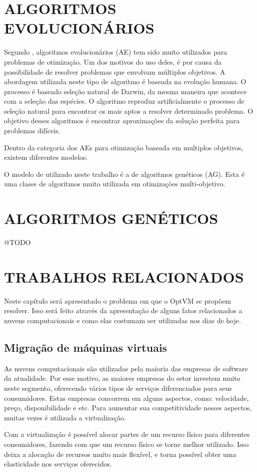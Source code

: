 \section{ALGORITMOS EVOLUCIONÁRIOS}
Segundo \cite{ticona}, algoritmos evolucionários (AE) tem sido muito utilizados para problemas de 
otimização. Um dos motivos do uso deles, é por causa da possibilidade de resolver problemas que 
envolvam múltiplos objetivos. A abordagem utilizada neste tipo de algoritmo é baseada na 
evolução humana. O processo é baseado seleção natural de Darwin, da mesma maneira que acontece com a 
seleção das espécies. O algoritmo reproduz artificialmente o processo de seleção natural para 
encontrar os mais aptos a resolver determinado problema. O objetivo desses algoritmos é 
encontrar aproximações da solução perfeita para problemas difíceis. 

Dentro da categoria dos AEs para otimização baseada em multiplos objetivos, existem diferentes modelos. 

O modelo de utilizado neste trabalho é a de algoritmos genéticos (AG). Esta é uma classe de 
algoritmos muito utilizada em otimizações multi-objetivo. 

\section{ALGORITMOS GENÉTICOS}
@TODO

\section{TRABALHOS RELACIONADOS}
Neste capítulo será apresentado o problema em que o OptVM se propõem resolver. 
Isso será feito através da apresentação de alguns fatos relacionados a nuvens computacionais 
e como elas costumam ser utilizadas nos dias de hoje.

\subsection{Migração de máquinas virtuais}
As nuvens computacionais são utilizadas pela maioria das empresas de software da atualidade. 
Por esse motivo, as maiores empresas do setor investem muito neste segmento, 
oferecendo vários tipos de serviços diferenciados para seus consumidores. 
Estas empresas concorrem em alguns aspectos, como: velocidade, preço, disponibilidade e etc. 
Para aumentar sua competitividade nesses aspectos, muitas vezes é utilizada a virtualização.

Com a virtualização é possível alocar partes de um recurso físico para diferentes consumidores, 
fazendo com que um recurso físico se torne melhor utilizado. Isso deixa a alocação de recursos
muito mais flexível, e torna possível obter uma elasticidade nos serviços oferecidos. 

